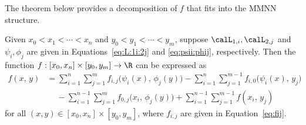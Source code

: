 \documentclass[review,hidelinks,onefignum,onetabnum]{siamart250211}
\begin{document}
The theorem below provides a decomposition of $f$ that fits into the MMNN structure.

\begin{theorem}
\label{thm:decomposition:2D}
Given \(x_0<x_1<\cdots<x_n\) and \(y_0<y_1<\cdots<y_m\),
    suppose $\calL_{1,i}, \calL_{2,j}$ and $\psi_i,\phi_j$ are given in Equations~\eqref{eq:L:1i:2j} and \eqref{eq:psii:phij}, respectively. Then the function $f:[x_0,x_n]\times [y_0, y_m]\to\R$ can be expressed as 
\begin{equation}
\label{eq:highD:decomposition}
    \begin{split}          
        f( x, \, y)
        & =\sum_{i=1}^n \sum_{j=1}^m f_{i,j}\Big( \psi_i(x), \, \phi_j(y)\Big)-
        \sum_{i=1}^n\sum_{j=1}^{m-1} f_{i,0}\Big(\psi_i(x),\, y_{j}\Big)
        \\ & \quad\   -  \sum_{i=1}^{n-1} \sum_{j=1}^m f_{0,j}\Big( x_i, \, \phi_j(y)\Big)+
        \sum_{i=1}^{n-1}\sum_{j=1}^{m-1} f (x_i,\, y_{j})
    \end{split}
\end{equation}
for all $(x,y)\in [x_0,x_n]\times [y_0,y_m]$, where $f_{i,j}$ are given in 
Equation~\eqref{eq:fij}.
\end{theorem}



\end{document}
